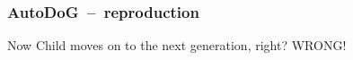 \documentclass{beamer}
\newcommand{\linespace}{\vskip 0.25cm}
\begin{document}
\begin{frame}
\end{frame}

\begin{frame}
	\frametitle{AutoDoG~--~reproduction}
	\centering
	Now Child moves on to the next generation, right?
	\pause
	\linespace\linespace
	\large WRONG!
\end{frame}
\end{document}
